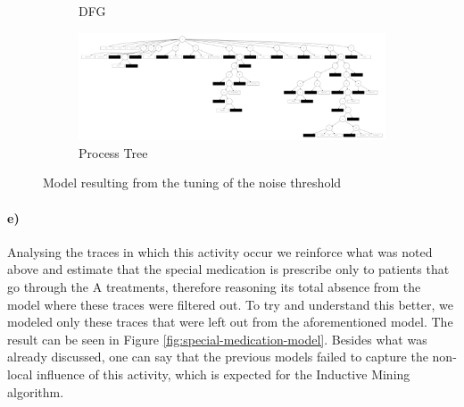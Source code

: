 \documentclass[12pt]{report}
\begin{document}
\begin{figure}[h]
\begin{subfigure}[b]{0.2\textwidth}
        \caption{DFG}
        \label{fig:figures-q1_d_dfg_noise_threshold_tuning-pdf}
    \end{subfigure}
    \hfill
    \begin{subfigure}[b]{0.7\textwidth}
        \centering
	\includegraphics[width=\textwidth]{figures/q1_d_noise_threshold_tuning.pdf}
        \caption{Process Tree}
        \label{fig:q1_d_noise_threshold_tuninig-pdf}
    \end{subfigure}
    \hfill
    \caption{Model resulting from the tuning of the noise threshold}
    \label{fig:noise-threshold-tuning-model}
\end{figure}

\paragraph{e)} 

Analysing the traces in which this activity occur we reinforce what was noted above and estimate that the special medication is prescribe only to patients that go through the A treatments, therefore reasoning its total absence from the model where these traces were filtered out. To try and understand this better, we modeled only these traces that were left out from the aforementioned model. The result can be seen in Figure \ref{fig:special-medication-model}. Besides what was already discussed, one can say that the previous models failed to capture the non-local influence of this activity, which is expected for the Inductive Mining algorithm.
\end{document}
